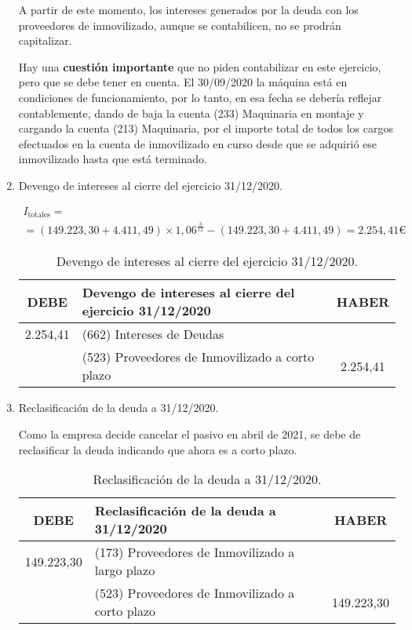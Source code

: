 \begin{enumerate}[label=\alph*)]
    A partir de este momento, los intereses generados por la deuda con los proveedores de inmovilizado, aunque se contabilicen, no se prodrán capitalizar.

    Hay una \textbf{cuestión importante} que no piden contabilizar en este ejercicio, pero que se debe tener en cuenta. El 30/09/2020 la máquina está en condiciones de funcionamiento, por lo tanto, en esa fecha se debería reflejar contablemente, dando de baja la cuenta (233) Maquinaria en montaje y cargando la cuenta (213) Maquinaria, por el importe total de todos los cargos efectuados en la cuenta de inmovilizado en curso desde que se adquirió ese inmovilizado hasta que está terminado.
    

    \item Devengo de intereses al cierre del ejercicio 31/12/2020.
    
    \begin{align*}
        I_{\text{totales}} = \\
        = (149.223,30 + 4.411,49) \times 1,06^{\frac{3}{12}} - (149.223,30 + 4.411,49) = 2.254,41 €
    \end{align*}

    \begin{table}[H]
        \centering
        \begin{tabular}{|c|p{6cm}|c|}
            \hline
            \rowcolor{blue!30}
            \textbf{DEBE} & \textbf{Devengo de intereses al cierre del ejercicio 31/12/2020} & \textbf{HABER} \\
            \hline
            2.254,41 & (662) Intereses de Deudas & \\
            \hline
            & (523) Proveedores de Inmovilizado a corto plazo & 2.254,41 \\
            \hline
        \end{tabular}
        \caption{Devengo de intereses al cierre del ejercicio 31/12/2020.}
        \label{tabla:devengo_intereses_2020}
    \end{table}

    \item Reclasificación de la deuda a 31/12/2020.
    
    Como la empresa decide cancelar el pasivo en abril de 2021, se debe de reclasificar la deuda indicando que ahora es a corto plazo.

    \begin{table}[H]
        \centering
        \begin{tabular}{|c|p{8cm}|c|}
            \hline
            \rowcolor{blue!30}
            \textbf{DEBE} & \textbf{Reclasificación de la deuda a 31/12/2020} & \textbf{HABER} \\
            \hline
            149.223,30 & (173) Proveedores de Inmovilizado a largo plazo & \\
            \hline
            & (523) Proveedores de Inmovilizado a corto plazo & 149.223,30 \\
            \hline
        \end{tabular}
        \caption{Reclasificación de la deuda a 31/12/2020.}
        \label{tabla:reclasificacion_deuda_2020}    
    \end{table}


\end{enumerate}
